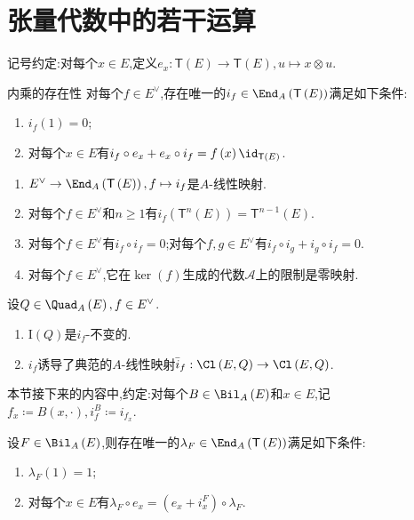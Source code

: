 \section{张量代数中的若干运算}

记号约定:对每个$x\in E$,定义$e_{x}:\mathsf{T}\left(E\right)\to\mathsf{T}\left(E\right),u\mapsto x\otimes u$.

\begin{lemma}{内乘的存在性}{}
	对每个$f\in E^{\vee}$,存在唯一的$i_{f}\in\End_{A}\left(\mathsf{T}\left(E\right)\right)$满足如下条件:
	\begin{enumerate}
		\item $i_{f}\left(1\right)=0$;
		\item 对每个$x\in E$有$i_{f}\circ e_{x}+e_{x}\circ i_{f}=f\left(x\right)\id_{\mathsf{T}\left(E\right)}$.
	\end{enumerate}
\end{lemma}

\begin{proposition}{}{}
	\begin{enumerate}
		\item $E^{\vee}\to\End_{A}\left(\mathsf{T}\left(E\right)\right),f\mapsto i_{f}$是$A$-线性映射.
		\item 对每个$f\in E^{\vee}$和$n\geq 1$有$i_{f}\left(\mathsf{T}^{n}\left(E\right)\right)=\mathsf{T}^{n-1}\left(E\right)$.
		\item 对每个$f\in E^{\vee}$有$i_{f}\circ i_{f}=0$;对每个$f,g\in E^{\vee}$有$i_{f}\circ i_{g}+i_{g}\circ i_{f}=0$.
		\item 对每个$f\in E^{\vee}$,它在$\ker\left(f\right)$生成的代数$\mathcal{A}$上的限制是零映射.
	\end{enumerate}
\end{proposition}

\begin{proposition}{}{}
	设$Q\in\Quad_{A}\left(E\right),f\in E^{\vee}$.
	\begin{enumerate}
		\item $\mathrm{I}\left(Q\right)$是$i_{f}$-不变的.
		\item $i_{f}$诱导了典范的$A$-线性映射$\bar{i}_{f}:\Cl\left(E,Q\right)\to\Cl\left(E,Q\right)$.
	\end{enumerate}
\end{proposition}

本节接下来的内容中,约定:对每个$B\in\Bil_{A}\left(E\right)$和$x\in E$,记$f_{x}\coloneq B\left(x,\cdot\right),i_{f}^{B}\coloneq i_{f_{x}}$.

\begin{lemma}{}{}
	设$F\in\Bil_{A}\left(E\right)$,则存在唯一的$\lambda_{F}\in\End_{A}\left(\mathsf{T}\left(E\right)\right)$满足如下条件:
	\begin{enumerate}
		\item $\lambda_{F}\left(1\right)=1$;
		\item 对每个$x\in E$有$\lambda_{F}\circ e_{x}=\left(e_{x}+i_{x}^{F}\right)\circ\lambda_{F}$.
	\end{enumerate}
\end{lemma}

